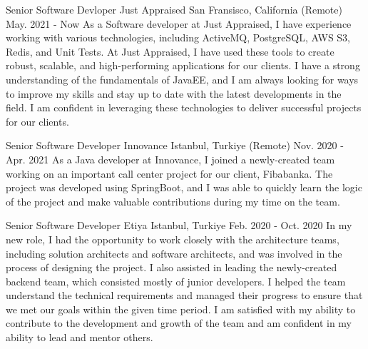 

\begin{cventries}

    \cventry
    {Senior Software Devloper} %
    {Just Appraised} %
    {San Fransisco, California (Remote)} %
    {May. 2021 - Now} %
    {
        As a Software developer at Just Appraised, I have experience working with various technologies, including ActiveMQ, PostgreSQL, AWS S3, Redis, and Unit Tests. At Just Appraised, I have used these tools to create robust, scalable, and high-performing applications for our clients.
    I have a strong understanding of the fundamentals of JavaEE, and I am always looking for ways to improve my skills and stay up to date with the latest developments in the field. I am confident in leveraging these technologies to deliver successful projects for our clients.
    }

    \cventry
    {Senior Software Developer} %
    {Innovance} %
    {Istanbul, Turkiye (Remote)} %
    {Nov. 2020 - Apr. 2021} %
    {
        As a Java developer at Innovance, I joined a newly-created team working on an important call center project for our client, Fibabanka. The project was developed using SpringBoot, and I was able to quickly learn the logic of the project and make valuable contributions during my time on the team.
    }

    \cventry
    {Senior Software Developer} %
    {Etiya} %
    {Istanbul, Turkiye} %
    {Feb. 2020 - Oct. 2020} %
    {
        In my new role, I had the opportunity to work closely with the architecture teams, including solution architects and software architects, and was involved in the process of designing the project.
    I also assisted in leading the newly-created backend team, which consisted mostly of junior developers. I helped the team understand the technical requirements and managed their progress to ensure that we met our goals within the given time period. I am satisfied with my ability to contribute to the development and growth of the team and am confident in my ability to lead and mentor others.
    }


\end{cventries}
